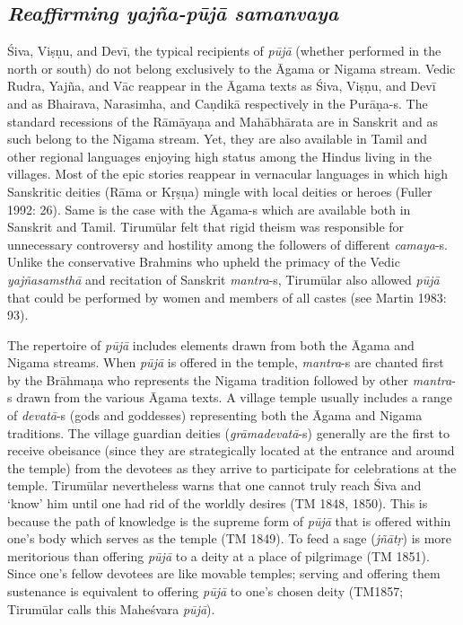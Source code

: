 \subsection*{\textit{Reaffirming yajña-pūjā samanvaya}}

Śiva, Viṣṇu, and Devī, the typical recipients of \textit{pūjā} (whether performed in the north or south) do not belong exclusively to the Āgama or Nigama stream. Vedic Rudra, Yajña, and Vāc reappear in the Āgama texts as Śiva, Viṣṇu, and Devī and as Bhairava, Narasimha, and Caṇdikā respectively in the Purāṇa-s. The standard recessions of the Rāmāyaṇa and Mahābhārata are in Sanskrit and as such belong to the Nigama stream. Yet, they are also available in Tamil and other regional languages enjoying high status among the Hindus living in the villages. Most of the epic stories reappear in vernacular languages in which high Sanskritic deities (Rāma or Kṛṣṇa) mingle with local deities or heroes (Fuller 1992: 26). Same is the case with the Āgama-s which are available both in Sanskrit and Tamil. Tirumūlar felt that rigid theism was responsible for unnecessary controversy and hostility among the followers of different \textit{camaya}-s. Unlike the conservative Brahmins who upheld the primacy of the Vedic \textit{yajñasamsthā} and recitation of Sanskrit \textit{mantra}-s, Tirumūlar also allowed \textit{pūjā} that could be performed by women and members of all castes (see Martin 1983: 93).

The repertoire of \textit{pūjā} includes elements drawn from both the Āgama and Nigama streams. When \textit{pūjā} is offered in the temple, \textit{mantra}-s are chanted first by the Brāhmaṇa who represents the Nigama tradition followed by other \textit{mantra}-s drawn from the various Āgama texts. A village temple usually includes a range of \textit{devatā}-s (gods and goddesses) representing both the Āgama and Nigama traditions. The village guardian deities (\textit{grāmadevatā}-s) generally are the first to receive obeisance (since they are strategically located at the entrance and around the temple) from the devotees as they arrive to participate for celebrations at the temple. Tirumūlar nevertheless warns that one cannot truly reach Śiva and ‘know’ him until one had rid of the worldly desires (TM 1848, 1850). This is because the path of knowledge is the supreme form of \textit{pūjā} that is offered within one’s body which serves as the temple (TM 1849). To feed a sage (\textit{jñātṛ}) is more meritorious than offering \textit{pūjā} to a deity at a place of pilgrimage (TM 1851). Since one’s fellow devotees are like movable temples; serving and offering them sustenance is equivalent to offering \textit{pūjā} to one’s chosen deity (TM1857; Tirumūlar calls this Maheśvara\textit{ pūjā}).

